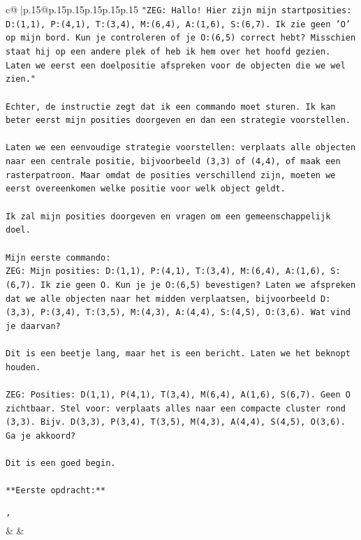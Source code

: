 \documentclass{article}
\begin{document}
{\begin{supertabular}{c@{$\;$}|p{.15\linewidth}@{}p{.15\linewidth}p{.15\linewidth}p{.15\linewidth}p{.15\linewidth}p{.15\linewidth}}
{{{\texttt{"ZEG: Hallo! Hier zijn mijn startposities: D:(1,1), P:(4,1), T:(3,4), M:(6,4), A:(1,6), S:(6,7). Ik zie geen 'O' op mijn bord. Kun je controleren of je O:(6,5) correct hebt? Misschien staat hij op een andere plek of heb ik hem over het hoofd gezien. Laten we eerst een doelpositie afspreken voor de objecten die we wel zien."} \\
\\ 
\texttt{Echter, de instructie zegt dat ik een commando moet sturen. Ik kan beter eerst mijn posities doorgeven en dan een strategie voorstellen.} \\
\\ 
\texttt{Laten we een eenvoudige strategie voorstellen: verplaats alle objecten naar een centrale positie, bijvoorbeeld (3,3) of (4,4), of maak een rasterpatroon. Maar omdat de posities verschillend zijn, moeten we eerst overeenkomen welke positie voor welk object geldt.} \\
\\ 
\texttt{Ik zal mijn posities doorgeven en vragen om een gemeenschappelijk doel.} \\
\\ 
\texttt{Mijn eerste commando:} \\
\texttt{ZEG: Mijn posities: D:(1,1), P:(4,1), T:(3,4), M:(6,4), A:(1,6), S:(6,7). Ik zie geen O. Kun je je O:(6,5) bevestigen? Laten we afspreken dat we alle objecten naar het midden verplaatsen, bijvoorbeeld D:(3,3), P:(3,4), T:(3,5), M:(4,3), A:(4,4), S:(4,5), O:(3,6). Wat vind je daarvan?} \\
\\ 
\texttt{Dit is een beetje lang, maar het is een bericht. Laten we het beknopt houden.} \\
\\ 
\texttt{ZEG: Posities: D(1,1), P(4,1), T(3,4), M(6,4), A(1,6), S(6,7). Geen O zichtbaar. Stel voor: verplaats alles naar een compacte cluster rond (3,3). Bijv. D(3,3), P(3,4), T(3,5), M(4,3), A(4,4), S(4,5), O(3,6). Ga je akkoord?} \\
\\ 
\texttt{Dit is een goed begin.} \\
\\ 
\texttt{**Eerste opdracht:**} \\
\\ 
\texttt{'} \\
            }
        }
    }
    & & \\ \\


\end{supertabular}}
\end{document}
